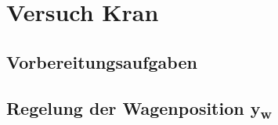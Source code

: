 \documentclass[10pt]{scrartcl}
\begin{document}
\newpage
\section{Versuch Kran}
\subsection{Vorbereitungsaufgaben}
\subsection{Regelung der Wagenposition y\textsubscript{w}}
\end{document}
